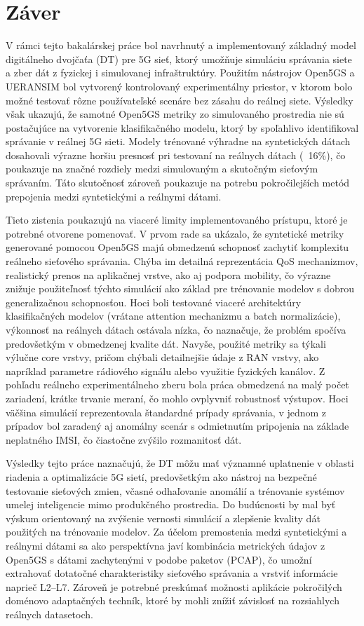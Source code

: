 \chapter{Záver}

V rámci tejto bakalárskej práce bol navrhnutý a implementovaný základný model digitálneho dvojčaťa (DT) pre 5G sieť, ktorý umožňuje simuláciu správania siete a zber dát z fyzickej i simulovanej infraštruktúry. Použitím nástrojov Open5GS a UERANSIM bol vytvorený kontrolovaný experimentálny priestor, v ktorom bolo možné testovať rôzne používateľské scenáre bez zásahu do reálnej siete. Výsledky však ukazujú, že samotné Open5GS metriky zo simulovaného prostredia nie sú postačujúce na vytvorenie klasifikačného modelu, ktorý by spoľahlivo identifikoval správanie v reálnej 5G sieti. Modely trénované výhradne na syntetických dátach dosahovali výrazne horšiu presnosť pri testovaní na reálnych dátach (~16\%), čo poukazuje na značné rozdiely medzi simulovaným a skutočným sieťovým správaním. Táto skutočnosť zároveň poukazuje na potrebu pokročilejších metód prepojenia medzi syntetickými a reálnymi dátami.

Tieto zistenia poukazujú na viaceré limity implementovaného prístupu, ktoré je potrebné otvorene pomenovať. V prvom rade sa ukázalo, že syntetické metriky generované pomocou Open5GS majú obmedzenú schopnosť zachytiť komplexitu reálneho sieťového správania. Chýba im detailná reprezentácia QoS mechanizmov, realistický prenos na aplikačnej vrstve, ako aj podpora mobility, čo výrazne znižuje použiteľnosť týchto simulácií ako základ pre trénovanie modelov s dobrou generalizačnou schopnosťou. Hoci boli testované viaceré architektúry klasifikačných modelov (vrátane attention mechanizmu a batch normalizácie), výkonnosť na reálnych dátach ostávala nízka, čo naznačuje, že problém spočíva predovšetkým v obmedzenej kvalite dát. Navyše, použité metriky sa týkali výlučne core vrstvy, pričom chýbali detailnejšie údaje z RAN vrstvy, ako napríklad parametre rádiového signálu alebo využitie fyzických kanálov. Z pohľadu reálneho experimentálneho zberu bola práca obmedzená na malý počet zariadení, krátke trvanie meraní, čo mohlo ovplyvniť robustnosť výstupov. Hoci väčšina simulácií reprezentovala štandardné prípady správania, v jednom z prípadov bol zaradený aj anomálny scenár s odmietnutím pripojenia na základe neplatného IMSI, čo čiastočne zvýšilo rozmanitosť dát.

Výsledky tejto práce naznačujú, že DT môžu mať významné uplatnenie v oblasti riadenia a optimalizácie 5G sietí, predovšetkým ako nástroj na bezpečné testovanie sieťových zmien, včasné odhaľovanie anomálií a trénovanie systémov umelej inteligencie mimo produkčného prostredia. Do budúcnosti by mal byť výskum orientovaný na zvýšenie vernosti simulácií a zlepšenie kvality dát použitých na trénovanie modelov. Za účelom premostenia medzi syntetickými a reálnymi dátami sa ako perspektívna javí kombinácia metrických údajov z Open5GS s dátami zachytenými v podobe paketov (PCAP), čo umožní extrahovať dotatočné charakteristiky sieťového správania a vrstviť informácie naprieč L2–L7. Zároveň je potrebné preskúmať možnosti aplikácie pokročilých doménovo adaptačných techník, ktoré by mohli znížiť závislosť na rozsiahlych reálnych datasetoch.

